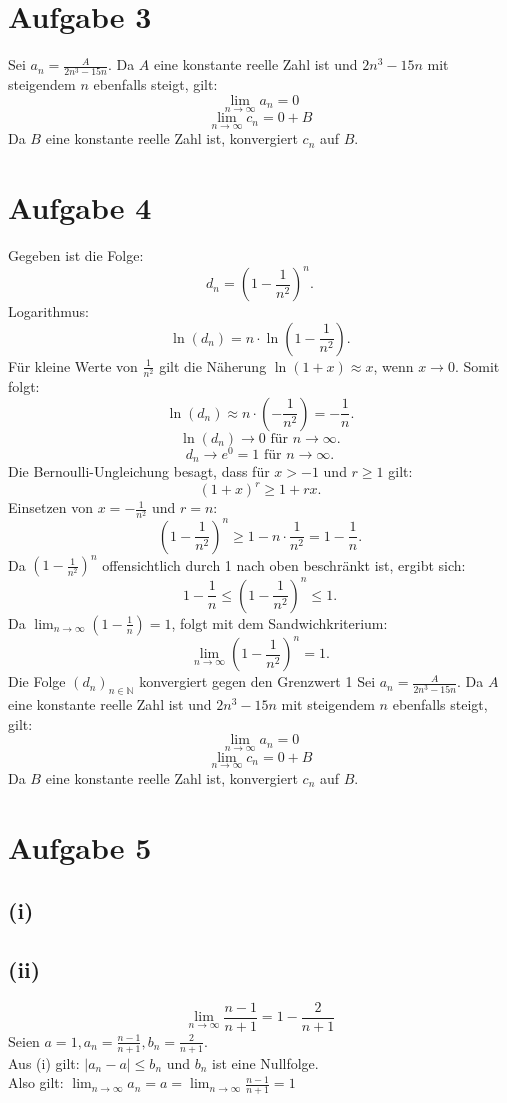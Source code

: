 \documentclass{article}
\begin{document}
\section{Aufgabe 3}
Sei $a_n = \frac{A}{2n^3-15n}$. Da $A$ eine konstante reelle Zahl ist und $2n^3-15n$ mit steigendem $n$ ebenfalls steigt, gilt:
\[\lim_{n \to \infty} a_n = 0\]
\[\lim_{n \to \infty} c_n = 0 + B\]
Da $B$ eine konstante reelle Zahl ist, konvergiert $c_n$ auf $B$.


\section{Aufgabe 4}
Gegeben ist die Folge:
\[d_n = \left(1 - \frac{1}{n^2}\right)^n.\]
Logarithmus:
\[\ln(d_n) = n \cdot \ln\left(1 - \frac{1}{n^2}\right).\]
Für kleine Werte von \(\frac{1}{n^2}\) gilt die Näherung \(\ln(1 + x) \approx x\), wenn \(x \to 0\). Somit folgt:
\[\ln(d_n) \approx n \cdot \left(-\frac{1}{n^2}\right) = -\frac{1}{n}.\]
\[\ln(d_n) \to 0 \text{ für } n \to \infty.\]
\[d_n \to e^0 = 1 \text{ für } n \to \infty.\]
Die Bernoulli-Ungleichung besagt, dass für \(x > -1\) und \(r \geq 1\) gilt:
\[(1 + x)^r \geq 1 + rx.\]
Einsetzen von \(x = -\frac{1}{n^2}\) und \(r = n\):
\[\left(1 - \frac{1}{n^2}\right)^n \geq 1 - n \cdot \frac{1}{n^2} = 1 - \frac{1}{n}.\]
Da \(\left(1 - \frac{1}{n^2}\right)^n\) offensichtlich durch 1 nach oben beschränkt ist, ergibt sich:
\[1 - \frac{1}{n} \leq \left(1 - \frac{1}{n^2}\right)^n \leq 1.\]
Da \(\lim_{n \to \infty} \left(1 - \frac{1}{n}\right) = 1\), folgt mit dem Sandwichkriterium:
\[\lim_{n \to \infty} \left(1 - \frac{1}{n^2}\right)^n = 1.\]
Die Folge \((d_n)_{n \in \mathbb{N}}\) konvergiert gegen den Grenzwert 1
Sei $a_n = \frac{A}{2n^3-15n}$. Da $A$ eine konstante reelle Zahl ist und $2n^3-15n$ mit steigendem $n$ ebenfalls steigt, gilt:
\[\lim_{n \to \infty} a_n = 0\]
\[\lim_{n \to \infty} c_n = 0 + B\]
Da $B$ eine konstante reelle Zahl ist, konvergiert $c_n$ auf $B$.

\section{Aufgabe 5}

\subsection{(i)}


\subsection{(ii)}
\[\lim_{n \to \infty} \frac{n-1}{n+1} = 1 - \frac{2}{n+1}\]
Seien $a = 1, a_n = \frac{n-1}{n+1}, b_n = \frac{2}{n+1}$. \\
Aus (i) gilt: $|a_n - a| \leq b_n$ und $b_n$ ist eine Nullfolge. \\
Also gilt: $\lim_{n\to\infty}a_n = a = \lim_{n\to\infty}\frac{n-1}{n+1} = 1$
\end{document}
